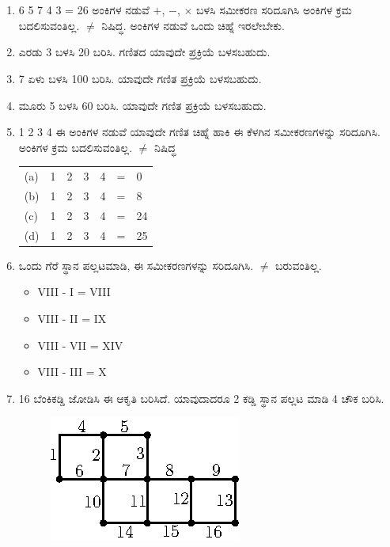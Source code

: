 \chapter[ಅಧ್ಯಾಯ 11]{}\label{chap11}

\begin{enumerate}
\renewcommand{\labelenumi}{\bf\theenumi.}
\itemsep=5pt
\item 6 5 7 4 3 = 26 ಅಂಕಿಗಳ ನಡುವೆ $+$, $-$, $\times$ ಬಳಸಿ ಸಮೀಕರಣ ಸರಿದೂಗಿಸಿ ಅಂಕಿಗಳ ಕ್ರಮ ಬದಲಿಸುವಂತಿಲ್ಲ. $\neq$ ನಿಷಿದ್ಧ. ಅಂಕಿಗಳ ನಡುವೆ ಒಂದು ಚಿಹ್ನೆ ಇರಲೇಬೇಕು. 

\item ಎರಡು 3 ಬಳಸಿ 20 ಬರಿಸಿ. ಗಣಿತದ ಯಾವುದೇ ಪ್ರಕ್ರಿಯೆ ಬಳಸಬಹುದು. 

\item 7 ಏಳು ಬಳಸಿ 100 ಬರಿಸಿ. ಯಾವುದೇ ಗಣಿತ ಪ್ರಕ್ರಿಯೆ ಬಳಸಬಹುದು. 

\item ಮೂರು 5 ಬಳಸಿ 60 ಬರಿಸಿ. ಯಾವುದೇ ಗಣಿತ ಪ್ರಕ್ರಿಯೆ ಬಳಸಬಹುದು. 

\item 1 2 3 4 ಈ ಅಂಕಿಗಳ ನಡುವೆ ಯಾವುದೇ ಗಣಿತ ಚಿಹ್ನೆ ಹಾಕಿ ಈ ಕೆಳಗಿನ ಸಮೀಕರಣಗಳನ್ನು ಸರಿದೂಗಿಸಿ. ಅಂಕಿಗಳ ಕ್ರಮ ಬದಲಿಸುವಂತಿಲ್ಲ. $\neq$ ನಿಷಿದ್ಧ 
\begin{tabular}[t]{lllllll}
(a) & 1 & 2 & 3 & 4 & = & 0 \\
(b) & 1 & 2 & 3 & 4 & = & 8\\
(c) & 1 & 2 & 3 & 4 & = & 24\\
(d) & 1 & 2 & 3 & 4 & = & 25
\end{tabular}

\item ಒಂದು ಗೆರೆ ಸ್ಥಾನ ಪಲ್ಲಟಮಾಡಿ, ಈ ಸಮೀಕರಣಗಳನ್ನು ಸರಿದೂಗಿಸಿ. $\neq$ ಬರುವಂತಿಲ್ಲ. 
\begin{itemize}
\item[(a)] VIII - I = VIII
\item[(b)] VIII - II = IX
\item[(c)] VIII - VII = XIV
\item[(d)] VIII - III = X
\end{itemize}

\item 16 ಬೆಂಕಿಕಡ್ಡಿ ಜೋಡಿಸಿ ಈ ಆಕೃತಿ ಬರಿಸಿದೆ. ಯಾವುದಾದರೂ 2 ಕಡ್ಡಿ ಸ್ಥಾನ ಪಲ್ಲಟ ಮಾಡಿ 4 ಚೌಕ ಬರಿಸಿ. 
\begin{figure}[H]
\centering
\includegraphics{images/chap11/q7.eps}
\end{figure}


\end{enumerate}
